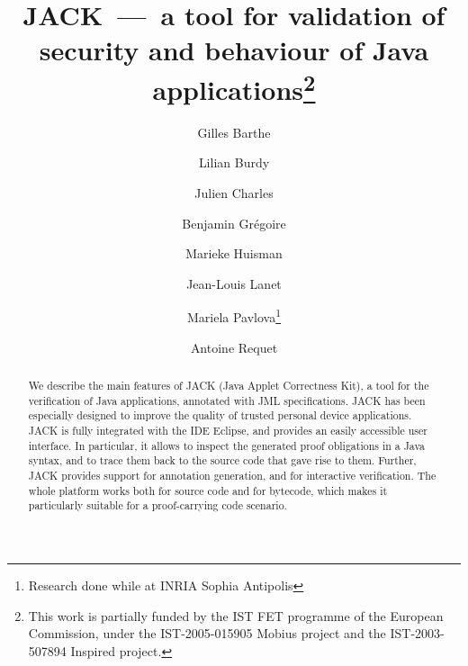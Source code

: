 \documentclass{llncs}
\title{JACK~---~a tool for validation of security and behaviour of Java
applications\thanks{This work is partially funded by the IST FET
programme of the European Commission, under the IST-2005-015905
\textsf{Mobius} project and the IST-2003-507894
\textsf{Inspired} project.}}
\author{Gilles Barthe\inst{1} \and
        Lilian Burdy\inst{2} \and
        Julien Charles\inst{1} \and
        Benjamin Gr\'egoire\inst{1} \and
        Marieke Huisman\inst{1} \and
        Jean-Louis Lanet\inst{3} \and
        Mariela Pavlova\inst{4}\thanks{Research done while at INRIA Sophia Antipolis} \and
        Antoine Requet\inst{3}}
\institute{INRIA Sophia Antipolis, France \and 
           ClearSy, France \and
           gemalto, France \and 
           Ludwig-Maximilians-Universit\"at M\"unchen, Germany}
\begin{document}
\maketitle      
\begin{abstract}
We describe the main features of JACK (Java Applet Correctness Kit), a
tool for the verification of Java applications, annotated with JML
specifications. JACK has been especially designed to improve the
quality of trusted personal device applications. JACK is fully
integrated with the IDE Eclipse, and provides an easily accessible
user interface. In particular, it allows to inspect the generated
proof obligations in a Java syntax, and to trace them back to the
source code that gave rise to them. Further, JACK provides support for
annotation generation, and for interactive verification. The whole
platform works both for source code and for bytecode, which makes it
particularly suitable for a proof-carrying code scenario.
\end{abstract}
        










\end{document}
